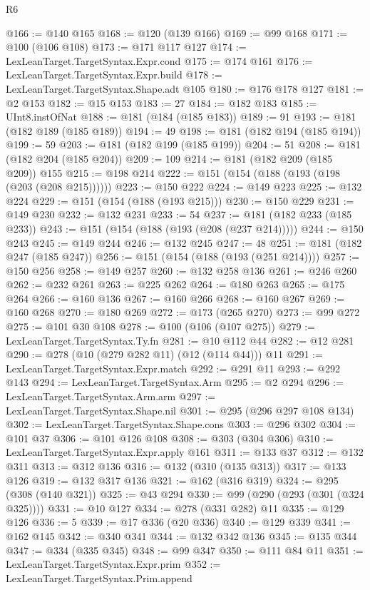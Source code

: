 \begin{lexlean}{R6}
\begin{coremodule}
@166 := @140 @165
@168 := @120 (@139 @166)
@169 := @99 @168
@171 := @100 (@106 @108)
@173 := @171 @117 @127
@174 := LexLeanTarget.TargetSyntax.Expr.cond
@175 := @174 @161
@176 := LexLeanTarget.TargetSyntax.Expr.build
@178 := LexLeanTarget.TargetSyntax.Shape.adt @105
@180 := @176 @178 @127
@181 := @2 @153
@182 := @15 @153
@183 := 27
@184 := @182 @183
@185 := UInt8.instOfNat
@188 := @181 (@184 (@185 @183))
@189 := 91
@193 := @181 (@182 @189 (@185 @189))
@194 := 49
@198 := @181 (@182 @194 (@185 @194))
@199 := 59
@203 := @181 (@182 @199 (@185 @199))
@204 := 51
@208 := @181 (@182 @204 (@185 @204))
@209 := 109
@214 := @181 (@182 @209 (@185 @209)) @155
@215 := @198 @214
@222 := @151 (@154 (@188 (@193 (@198 (@203 (@208 @215))))))
@223 := @150 @222
@224 := @149 @223
@225 := @132 @224
@229 := @151 (@154 (@188 (@193 @215)))
@230 := @150 @229
@231 := @149 @230
@232 := @132 @231
@233 := 54
@237 := @181 (@182 @233 (@185 @233))
@243 := @151 (@154 (@188 (@193 (@208 (@237 @214)))))
@244 := @150 @243
@245 := @149 @244
@246 := @132 @245
@247 := 48
@251 := @181 (@182 @247 (@185 @247))
@256 := @151 (@154 (@188 (@193 (@251 @214))))
@257 := @150 @256
@258 := @149 @257
@260 := @132 @258 @136
@261 := @246 @260
@262 := @232 @261
@263 := @225 @262
@264 := @180 @263
@265 := @175 @264
@266 := @160 @136
@267 := @160 @266
@268 := @160 @267
@269 := @160 @268
@270 := @180 @269
@272 := @173 (@265 @270)
@273 := @99 @272
@275 := @101 @30 @108
@278 := @100 (@106 (@107 @275))
@279 := LexLeanTarget.TargetSyntax.Ty.fn
@281 := @10 @112 @44
@282 := @12 @281
@290 := @278 (@10 (@279 @282 @11) (@12 (@114 @44))) @11
@291 := LexLeanTarget.TargetSyntax.Expr.match
@292 := @291 @11
@293 := @292 @143
@294 := LexLeanTarget.TargetSyntax.Arm
@295 := @2 @294
@296 := LexLeanTarget.TargetSyntax.Arm.arm
@297 := LexLeanTarget.TargetSyntax.Shape.nil
@301 := @295 (@296 @297 @108 @134)
@302 := LexLeanTarget.TargetSyntax.Shape.cons
@303 := @296 @302
@304 := @101 @37
@306 := @101 @126 @108
@308 := @303 (@304 @306)
@310 := LexLeanTarget.TargetSyntax.Expr.apply @161
@311 := @133 @37
@312 := @132 @311
@313 := @312 @136
@316 := @132 (@310 (@135 @313))
@317 := @133 @126
@319 := @132 @317 @136
@321 := @162 (@316 @319)
@324 := @295 (@308 (@140 @321))
@325 := @43 @294
@330 := @99 (@290 (@293 (@301 (@324 @325))))
@331 := @10 @127
@334 := @278 (@331 @282) @11
@335 := @129 @126
@336 := 5
@339 := @17 @336 (@20 @336)
@340 := @129 @339
@341 := @162 @145
@342 := @340 @341
@344 := @132 @342 @136
@345 := @135 @344
@347 := @334 (@335 @345)
@348 := @99 @347
@350 := @111 @84 @11
@351 := LexLeanTarget.TargetSyntax.Expr.prim
@352 := LexLeanTarget.TargetSyntax.Prim.append

\end{coremodule}
\end{lexlean}
